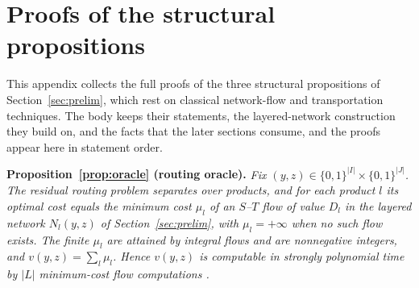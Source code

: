 \section{Proofs of the structural propositions}\label{app:proofs}

This appendix collects the full proofs of the three structural
propositions of Section~\ref{sec:prelim}, which rest on classical
network-flow and transportation techniques. The body keeps their
statements, the layered-network construction they build on, and the
facts that the later sections consume, and the proofs appear here in
statement order.

\medskip\noindent
\textbf{Proposition~\ref{prop:oracle} (routing oracle).}
\emph{Fix $(y,z)\in\{0,1\}^{|I|}\times\{0,1\}^{|J|}$. The residual routing problem
separates over products, and for each product $l$ its optimal cost equals
the minimum cost $\mu_l$ of an $S$--$T$ flow of value $D_l$ in the layered
network $N_l(y,z)$ of Section~\ref{sec:prelim}, with $\mu_l=+\infty$ when
no such flow exists. The finite $\mu_l$ are attained by integral flows and
are nonnegative integers, and $v(y,z)=\sum_l\mu_l$. Hence $v(y,z)$ is
computable in strongly polynomial time by $|L|$ minimum-cost flow
computations \citep{Orlin1993}.}

